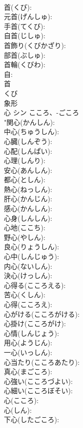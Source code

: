 \documentclass[8pt]{extreport}
\begin{document}
\begin{CJK}{UTF8}{min}
\\	首(くび): 
\\	元首(げんしゅ): 
\\	手首(てくび): 
\\	自首(じしゅ): 
\\	首飾り(くびかざり): 
\\	部首(ぶしゅ): 
\\	首輪(くびわ): 
\\	自: 
\\	首	
\\	くび	
\\	象形 
\\	心	シン	こころ、-ごころ		
\\	"関心(かんしん): 
\\	中心(ちゅうしん): 
\\	心臓(しんぞう): 
\\	心配(しんぱい): 
\\	心理(しんり): 
\\	安心(あんしん): 
\\	都心(としん): 
\\	熱心(ねっしん): 
\\	肝心(かんじん): 
\\	感心(かんしん): 
\\	心身(しんしん): 
\\	心地(ここち): 
\\	野心(やしん): 
\\	良心(りょうしん): 
\\	心中(しんじゅう): 
\\	内心(ないしん): 
\\	決心(けっしん): 
\\	心得る(こころえる): 
\\	苦心(くしん): 
\\	心得(こころえ): 
\\	心がける(こころがける): 
\\	心掛け(こころがけ): 
\\	心情(しんじょう): 
\\	用心(ようじん): 
\\	一心(いっしん): 
\\	心当たり(こころあたり): 
\\	真心(まごころ): 
\\	心強い(こころづよい): 
\\	心細い(こころぼそい): 
\\	心(こころ): 
\\	心(しん): 
\\	下心(したごころ): 

\end{CJK}
\end{document}

